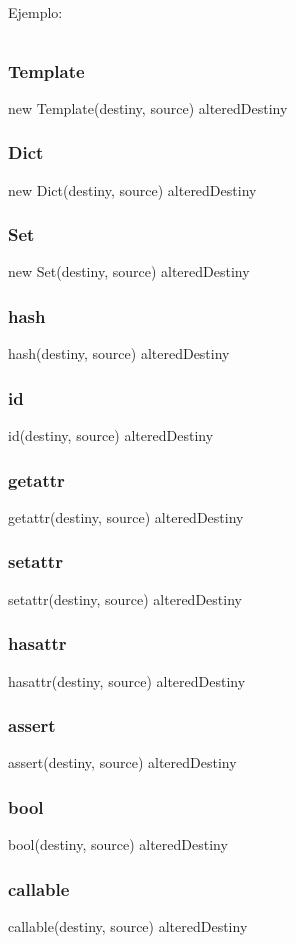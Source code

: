 \noindent
Ejemplo:
\begin{lstlisting}[style=consola]
\end{lstlisting}

\subsubsection*{Template}
new Template(destiny, source) \rightarrow alteredDestiny
\subsubsection*{Dict}
new Dict(destiny, source) \rightarrow alteredDestiny
\subsubsection*{Set}
new Set(destiny, source) \rightarrow alteredDestiny
\subsubsection*{hash}
hash(destiny, source) \rightarrow alteredDestiny
\subsubsection*{id}
id(destiny, source) \rightarrow alteredDestiny
\subsubsection*{getattr}
getattr(destiny, source) \rightarrow alteredDestiny
\subsubsection*{setattr}
setattr(destiny, source) \rightarrow alteredDestiny
\subsubsection*{hasattr}
hasattr(destiny, source) \rightarrow alteredDestiny
\subsubsection*{assert}
assert(destiny, source) \rightarrow alteredDestiny
\subsubsection*{bool}
bool(destiny, source) \rightarrow alteredDestiny
\subsubsection*{callable}
callable(destiny, source) \rightarrow alteredDestiny
